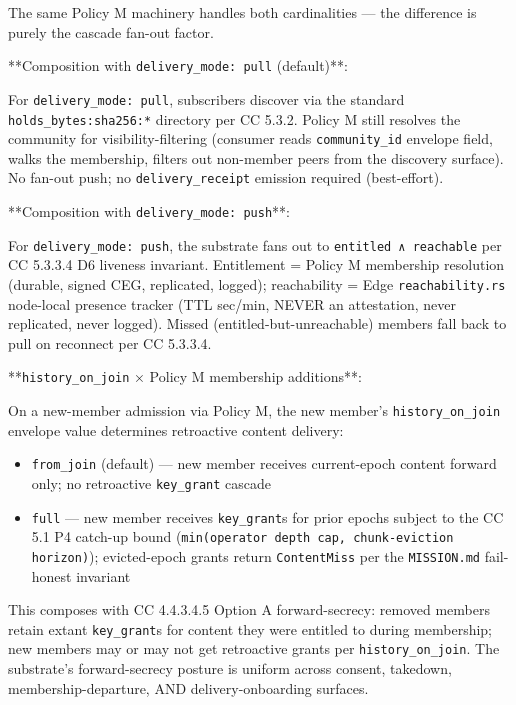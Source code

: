 \documentclass[11pt]{article}
\begin{document}
The same Policy M machinery handles both cardinalities — the difference is purely the cascade fan-out factor.


**Composition with \texttt{delivery\_mode: pull} (default)**:


For \texttt{delivery\_mode: pull}, subscribers discover via the standard \texttt{holds\_bytes:sha256:*} directory per CC 5.3.2. Policy M still resolves the community for visibility-filtering (consumer reads \texttt{community\_id} envelope field, walks the membership, filters out non-member peers from the discovery surface). No fan-out push; no \texttt{delivery\_receipt} emission required (best-effort).


**Composition with \texttt{delivery\_mode: push}**:


For \texttt{delivery\_mode: push}, the substrate fans out to \texttt{entitled ∧ reachable} per CC 5.3.3.4 D6 liveness invariant. Entitlement = Policy M membership resolution (durable, signed CEG, replicated, logged); reachability = Edge \texttt{reachability.rs} node-local presence tracker (TTL sec/min, NEVER an attestation, never replicated, never logged). Missed (entitled-but-unreachable) members fall back to pull on reconnect per CC 5.3.3.4.


**\texttt{history\_on\_join} × Policy M membership additions**:


On a new-member admission via Policy M, the new member's \texttt{history\_on\_join} envelope value determines retroactive content delivery:


\begin{itemize}\setlength\itemsep{0pt}
\item \texttt{from\_join} (default) — new member receives current-epoch content forward only; no retroactive \texttt{key\_grant} cascade
\item \texttt{full} — new member receives \texttt{key\_grant}s for prior epochs subject to the CC 5.1 P4 catch-up bound (\texttt{min(operator depth cap, chunk-eviction horizon)}); evicted-epoch grants return \texttt{ContentMiss} per the \texttt{MISSION.md} fail-honest invariant
\end{itemize}


This composes with CC 4.4.3.4.5 Option A forward-secrecy: removed members retain extant \texttt{key\_grant}s for content they were entitled to during membership; new members may or may not get retroactive grants per \texttt{history\_on\_join}. The substrate's forward-secrecy posture is uniform across consent, takedown, membership-departure, AND delivery-onboarding surfaces.
\end{document}
